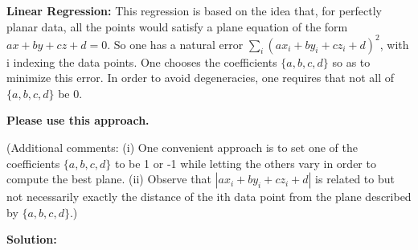 \documentclass[conference,onecolumn]{IEEEtran}
\begin{document}
\begin{enumerate}[label=\arabic{enumi}.]
\begin{enumerate}
                        \textbf{Linear Regression:} This regression is based on the idea that, for perfectly planar data, all the points would satisfy a plane equation of the form $ax + by + cz + d = 0$.
                        So one has a natural error $\sum_i (ax_i + by_i + cz_i + d)^2$, with i indexing the data points.
                        One chooses the coefficients $\{a, b, c, d\}$ so as to minimize this error.
                        In order to avoid degeneracies, one requires that not all of $\{a, b, c, d\}$ be 0.

                        \textbf{Please use this approach.}

                        (Additional comments: (i) One convenient approach is to set one of the coefficients $\{a, b, c, d\}$ to be 1 or -1 while letting the others vary in order to compute the best plane.
                        (ii) Observe that $|ax_i + by_i + cz_i + d|$ is related to but not necessarily exactly the distance of the ith data point from the plane described by $\{a, b, c, d\}$.)

                        \textbf{Solution:}


\end{enumerate}
\end{enumerate}
\end{document}
